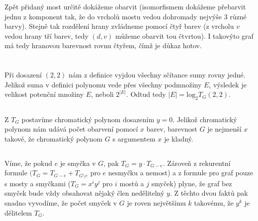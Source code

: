 \documentclass{scrartcl}
\begin{document}
    Zpět přidaný most určitě dokážeme obarvit (isomorfismem dokážeme přebarvit jednu z komponent tak, že do vrcholů mostu vedou dohromady nejvýše 3 různé barvy). Stejně tak rozdělení hrany zvládneme pomocí čtyř barev (z vrcholu $v$ vedou hrany tří barev, tedy $(d,v)$ můžeme obarvit tou čtvrtou). I takovýto graf má tedy hranovou barevnost rovnu čtyřem, čímž je důkaz hotov.

    \section{}
    \section{}
    \section{}
    \subsection{}
    Při dosazení $(2,2)$ nám z definice vyjdou všechny sčítance sumy rovny jedné. Jelikož suma v definici polynomu vede přes všechny podmnožiny $E$, výsledek je velikost potenční množiny $E$, neboli $2^{\vert E \vert}$. Odtud tedy $\vert E \vert = \text{log}_2 T_G(2,2)$.

    \subsection{}
    Z $T_G$ postavíme chromatický polynom dosazením $y = 0$. Jelikož chromatický polynom nám udává počet obarvení pomocí $x$ barev, barevnost $G$ je nejmenší $x$ takové, že chromatický polynom $G$ s argumentem $x$ je kladný.

    \subsection{}
    Víme, že pokud $e$ je smyčka v $G$, pak $T_G = y \cdot T_{G-e}$. Zároveň z rekurentní formule $(T_G = T_{G-e} + T_{G\setminus e}$ pro $e$ nesmyčku a nemost) a z formule pro graf pouze s mosty a smyčkami ($T_G = x^iy^j$ pro $i$ mostů a $j$ smyček) plyne, že graf bez smyček bude vždy obsahovat nějaký člen nedělitelný $y$. Z těchto dvou faktů pak snadno vyvodíme, že počet smyček v $G$ je roven největšímu $k$ takovému, že $y^k$ je dělitelem $T_G$. 
    
\end{document}
